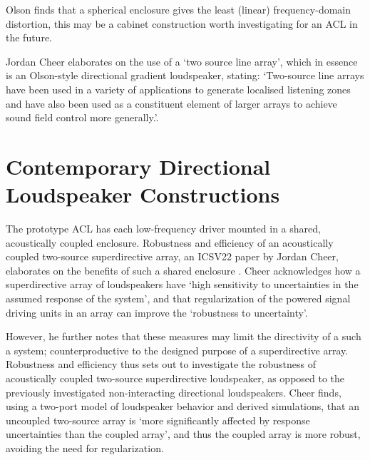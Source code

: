 \documentclass{report}
\begin{document}
        Olson finds that a spherical enclosure gives the least (linear) frequency-domain distortion, this may be a cabinet construction worth investigating for an ACL in the future. 

        Jordan Cheer elaborates on the use of a `two source line array', which in essence is an Olson-style directional gradient loudspeaker, stating: `Two-source line arrays have been used in a variety of applications to generate localised listening zones and have also been used as a constituent element of larger arrays to achieve sound field control more generally.'\cite{cheer2015robustness}.

        \newpage
    \section{Contemporary Directional Loudspeaker Constructions}
        The prototype ACL has each low-frequency driver mounted in a shared, acoustically coupled enclosure.
        Robustness and efficiency of an acoustically coupled two-source superdirective array, an ICSV22 paper by Jordan Cheer, elaborates on the benefits of such a shared enclosure \cite{cheer2015robustness}.
        Cheer acknowledges how a superdirective array of loudspeakers have `high sensitivity to uncertainties in the assumed response of the system', and that regularization of the powered signal driving units in an array can improve the `robustness to uncertainty'.
        
        However, he further notes that these measures may limit the directivity of a such a system; counterproductive to the designed purpose of a superdirective array.
        Robustness and efficiency thus sets out to investigate the robustness of acoustically coupled two-source superdirective loudspeaker, as opposed to the previously investigated non-interacting directional loudspeakers.
        Cheer finds, using a two-port model of loudspeaker behavior and derived simulations, that an uncoupled two-source array is `more significantly affected by response uncertainties than the coupled array', and thus the coupled array is more robust, avoiding the need for regularization.
        
\end{document}
